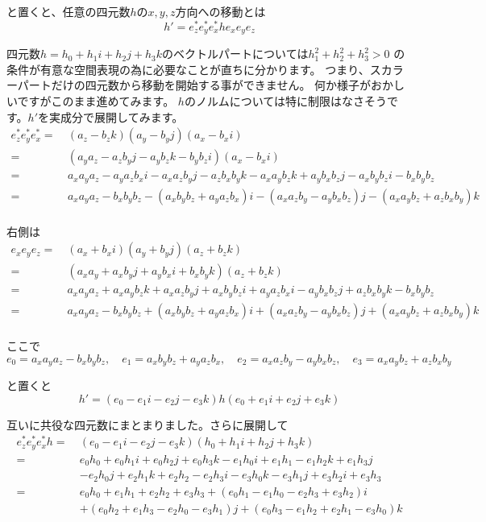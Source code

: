 \documentclass[a4paper,12pt,notitlepage]{jsreport}
\begin{document}
と置くと、任意の四元数$h$の$x,y,z$方向への移動とは
\begin{equation}
h'=e_z^*e_y^*e_x^*he_xe_ye_z
\end{equation}

四元数$h=h_0+h_1i+h_2j+h_3k$のベクトルパートについては$h_1^2+h_2^2+h_3^2>0$
の条件が有意な空間表現の為に必要なことが直ちに分かります。
つまり、スカラーパートだけの四元数から移動を開始する事ができません。
何か様子がおかしいですがこのまま進めてみます。
$h$のノルムについては特に制限はなさそうです。$h'$を実成分で展開してみます。
\begin{equation}
\begin{split}
e_z^*e_y^*e_x^*=~&(a_z-b_zk)(a_y-b_yj)(a_x-b_xi)\\
=~&(a_ya_z-a_zb_yj-a_yb_zk-b_yb_zi)(a_x-b_xi)\\
=~&a_xa_ya_z-a_ya_zb_xi-a_xa_zb_yj-a_zb_xb_yk-a_xa_yb_zk+a_yb_xb_zj-a_xb_yb_zi-b_xb_yb_z\\
=~&a_xa_ya_z-b_xb_yb_z-(a_xb_yb_z+a_ya_zb_x)i-(a_xa_zb_y-a_yb_xb_z)j-(a_xa_yb_z+a_zb_xb_y)k\\
\end{split}
\end{equation}

右側は
\begin{equation}
\begin{split}
e_xe_ye_z=~&(a_x+b_xi)(a_y+b_yj)(a_z+b_zk)\\
=~&(a_xa_y+a_xb_yj+a_yb_xi+b_xb_yk)(a_z+b_zk)\\
=~&a_xa_ya_z+a_xa_yb_zk+a_xa_zb_yj+a_xb_yb_zi+a_ya_zb_xi-a_yb_xb_zj+a_zb_xb_yk-b_xb_yb_z\\
=~&a_xa_ya_z-b_xb_yb_z+(a_xb_yb_z+a_ya_zb_x)i+(a_xa_zb_y-a_yb_xb_z)j+(a_xa_yb_z+a_zb_xb_y)k\\
\end{split}
\end{equation}

ここで
\begin{equation}
e_0=a_xa_ya_z-b_xb_yb_z,\quad e_1=a_xb_yb_z+a_ya_zb_x,\quad e_2=a_xa_zb_y-a_yb_xb_z,\quad e_3=a_xa_yb_z+a_zb_xb_y
\end{equation}

と置くと
\begin{equation}
h'=(e_0-e_1i-e_2j-e_3k)h(e_0+e_1i+e_2j+e_3k)
\end{equation}

互いに共役な四元数にまとまりました。さらに展開して
\begin{equation}
\begin{split}
e_z^*e_y^*e_x^*h=~&(e_0-e_1i-e_2j-e_3k)(h_0+h_1i+h_2j+h_3k)\\
=~&e_0h_0+e_0h_1i+e_0h_2j+e_0h_3k-e_1h_0i+e_1h_1-e_1h_2k+e_1h_3j\\
&-e_2h_0j+e_2h_1k+e_2h_2-e_2h_3i-e_3h_0k-e_3h_1j+e_3h_2i+e_3h_3\\
=~&e_0h_0+e_1h_1+e_2h_2+e_3h_3+(e_0h_1-e_1h_0-e_2h_3+e_3h_2)i\\
&+(e_0h_2+e_1h_3-e_2h_0-e_3h_1)j+(e_0h_3-e_1h_2+e_2h_1-e_3h_0)k\\
\end{split}
\end{equation}
\end{document}
